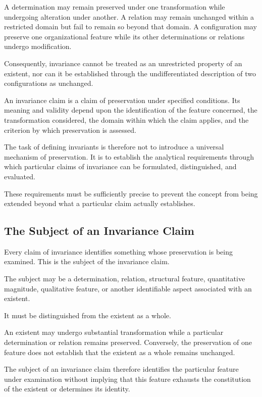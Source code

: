 A determination may remain preserved under one
transformation while undergoing alteration under
another. A relation may remain unchanged within
a restricted domain but fail to remain so beyond
that domain. A configuration may preserve one
organizational feature while its other determinations
or relations undergo modification.

Consequently, invariance cannot be treated as an
unrestricted property of an existent, nor can it
be established through the undifferentiated description
of two configurations as unchanged.

An invariance claim is a claim of preservation under
specified conditions. Its meaning and validity depend
upon the identification of the feature concerned,
the transformation considered, the domain within
which the claim applies, and the criterion by which
preservation is assessed.

The task of defining invariants is therefore not
to introduce a universal mechanism of preservation.
It is to establish the analytical requirements
through which particular claims of invariance
can be formulated, distinguished, and evaluated.

These requirements must be sufficiently precise
to prevent the concept from being extended beyond
what a particular claim actually establishes.

\subsection{The Subject of an Invariance Claim}

Every claim of invariance identifies something
whose preservation is being examined. This is
the subject of the invariance claim.

The subject may be a determination, relation,
structural feature, quantitative magnitude,
qualitative feature, or another identifiable
aspect associated with an existent.

It must be distinguished from the existent as
a whole.

An existent may undergo substantial transformation
while a particular determination or relation
remains preserved. Conversely, the preservation
of one feature does not establish that the
existent as a whole remains unchanged.

The subject of an invariance claim therefore
identifies the particular feature under examination
without implying that this feature exhausts
the constitution of the existent or determines
its identity.


